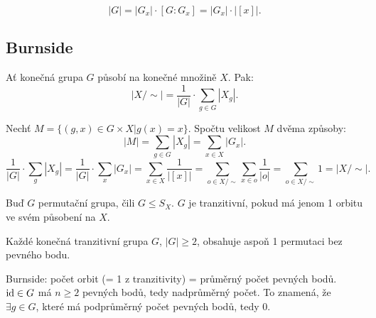 \documentclass[12pt]{article}                   %
\begin{document}
        \begin{dusledek}
            $$ |G| = |G_x|·[G : G_x] = |G_x|·|[x]|. $$
        \end{dusledek}


    \subsection{Burnside}
        \begin{veta}[Burnsideova]
            Ať konečná grupa $G$ působí na konečné množině $X$. Pak:
            $$ |X/\sim| = \frac{1}{|G|}·\sum_{g \in G} |X_g|. $$

            \begin{dukazin}
                Nechť $M = \{(g, x) \in G \times X | g(x) = x\}$. Spočtu velikost $M$ dvěma způsoby:
                $$ |M| = \sum_{g \in G}|X_g| = \sum_{x \in X}|G_x|. $$
                $$ \frac{1}{|G|}·\sum_g |X_g| = \frac{1}{|G|}·\sum_x |G_x| = \sum_{x \in X}\frac{1}{|[x]|} = \sum_{o \in X/\sim} \sum_{x \in o} \frac{1}{|o|} = \sum_{o \in X/\sim} 1 = |X/\sim|. $$ 
            \end{dukazin}
        \end{veta}


        \begin{definice}[Tranzitivní]
            Buď $G$ permutační grupa, čili $G ≤ S_X$. $G$ je tranzitivní, pokud má jenom 1 orbitu ve svém působení na $X$.
        \end{definice}

        \begin{veta}[Jordanova]
            Každé konečná tranzitivní grupa $G$, $|G|≥2$, obsahuje aspoň 1 permutaci bez pevného bodu.

            \begin{dukazin}
                Burnside: počet orbit (= 1 z tranzitivity) = průměrný počet pevných bodů. $\operatorname{id} \in G$ má $n ≥ 2$ pevných bodů, tedy nadprůměrný počet. To znamená, že $\exists g \in G$, které má podprůměrný počet pevných bodů, tedy 0.
            \end{dukazin}
        \end{veta}
\end{document}

